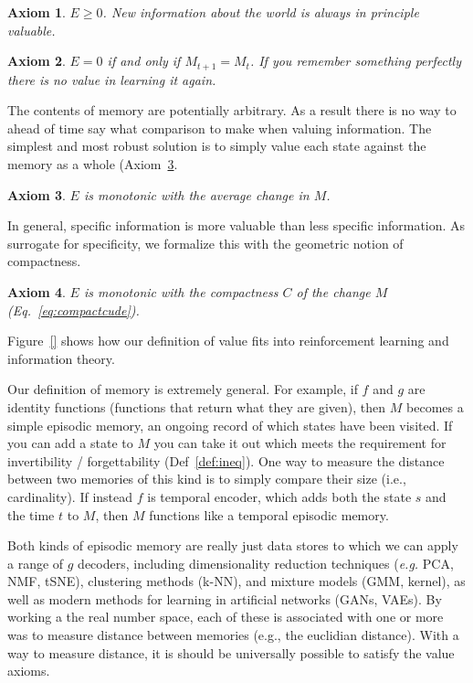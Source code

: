 \documentclass[9pt,twocolumn,twoside]{pnas-new}
\newtheorem{axiom}{Axiom}
\begin{document}
\begin{axiom}
    $E \geq 0$. New information about the world is always \textit{in principle} valuable.
    \label{ax:2}
\end{axiom}

\begin{axiom}
    $E = 0$ if and only if $M_{t+1} = M_{t}$. If you remember something perfectly there is no value in learning it again. 
    \label{ax:3}
\end{axiom}

\noindent
The contents of memory are potentially arbitrary. As a result there is no way to ahead of time say what comparison to make when valuing information. The simplest and most robust solution is to simply value each state against the memory as a whole (Axiom~\ref{ax:4}. 
\begin{axiom}
    $E$ is monotonic with the average change in $M$.
    \label{ax:4}
\end{axiom}

\noindent
In general, specific information is more valuable than less specific information. As surrogate for specificity, we formalize this with the geometric notion of compactness.
\begin{axiom}
    $E$ is monotonic with the compactness $C$ of the change $M$ (Eq.~\ref{eq:compactcude}).
    \label{ax:5}
\end{axiom}
\noindent

Figure~\ref{} shows how our definition of value fits into reinforcement learning and information theory. 

Our definition of memory is extremely general. For example, if $f$ and $g$ are identity functions (functions that return what they are given), then $M$ becomes a simple episodic memory, an ongoing record of which states have been visited. If you can add a state to $M$ you can take it out which meets the requirement for invertibility / forgettability (Def~\ref{def:ineq}). One way to measure the distance between two memories of this kind is to simply compare their size (i.e., cardinality). If instead $f$ is temporal encoder, which adds both the state $s$ and the time $t$ to $M$, then $M$ functions like a temporal episodic memory.  

Both kinds of episodic memory are really just data stores to which we can apply a range of $g$ decoders, including dimensionality reduction techniques (\textit{e.g.} PCA, NMF, tSNE), clustering methods (k-NN), and mixture models (GMM, kernel), as well as modern methods for learning in artificial networks (GANs, VAEs). By working a the real number space, each of these is associated with one or more was to measure distance between memories (e.g., the euclidian distance). With a way to measure distance, it is should be universally possible to satisfy the value axioms.
\end{document}
